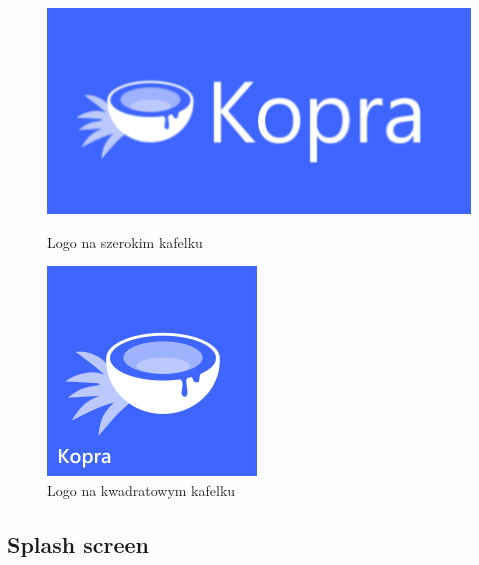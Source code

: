 \documentclass[a4paper,twoside,titlepage,openright]{book}
\begin{document}
\begin{figure}[htp]
	\centering
	\begin{minipage}[b]{0.3\textwidth}
		\includegraphics[width=\textwidth]{kafelekSzeroki.png}
		\caption{Logo na szerokim kafelku}
	\end{minipage}
\hspace*{60px}
	\begin{minipage}[b]{0.3\textwidth}
		\includegraphics[width=\textwidth]{kafelekKwadratowy.png}
		\caption{Logo na kwadratowym kafelku}
	\end{minipage}
	\hfill
\end{figure}


\subsection{Splash screen}
\end{document}
